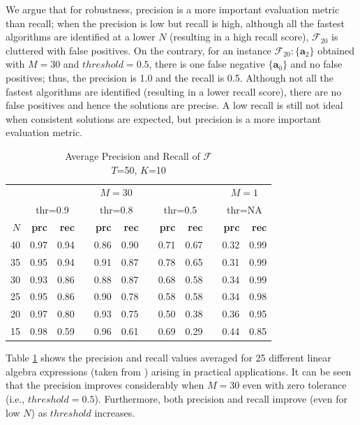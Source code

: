 \documentclass[conference]{IEEEtran}
\begin{document}
We argue that for robustness, precision is a more important evaluation metric than recall; when the precision is low but
recall is high, although all the fastest algorithms are identified at a lower $N$ (resulting in a high recall score),
$\mathcal{F}_{20}$ is cluttered with false positives. On the contrary, for an instance $\mathcal{F}_{20} : \{\mathbf{a}_2\}$ obtained with $M=30$ and
$threshold=0.5$, there is one false negative $\{\mathbf{a}_0\}$ and no false positives; thus, the precision is 1.0 and
the recall is 0.5. Although not all the fastest algorithms are identified (resulting in a lower recall score), there are
no false positives and hence the solutions are precise. A low recall is still not ideal when consistent solutions are expected, but precision is a more important evaluation metric. 
\begin{table}[h!]
	\begin{center}
		\renewcommand{\arraystretch}{1.2}
		\begin{tabular}{@{}r rr c rr c rr c rr@{}}
			\toprule
			& \multicolumn{8}{c}{$M=30$} & & \multicolumn{2}{c}{$M=1$} \\
			\cmidrule{2-9} \cmidrule{11-12}
			& \multicolumn{2}{c}{thr=0.9} & & \multicolumn{2}{c}{thr=0.8} & & \multicolumn{2}{c}{thr=0.5} & & \multicolumn{2}{c}{thr=NA} \\
			\cmidrule{2-3} \cmidrule{5-6} \cmidrule{8-9} \cmidrule{11-12}
			{$N$} & \textbf{prc} & \textbf{rec} && \textbf{prc} & \textbf{rec} && \textbf{prc} & \textbf{rec} && \textbf{prc} & \textbf{rec} \\
			\midrule
			{40} & 0.97  & 0.94  && 0.86  & 0.90  && 0.71  & 0.67 && 0.32 & 0.99 \\
			{35} & 0.95  & 0.94  && 0.91  & 0.87  && 0.78  & 0.65 && 0.31 & 0.99 \\
			{30} & 0.93  & 0.86  && 0.88  & 0.87  && 0.68  & 0.58 && 0.34 & 0.99 \\
			{25} & 0.95  & 0.86  && 0.90  & 0.78  && 0.58  & 0.58 && 0.34 & 0.98 \\
			{20} & 0.97  & 0.80  && 0.93  & 0.75  && 0.50  & 0.38 && 0.36 & 0.95 \\
			{15} & 0.98  & 0.59  && 0.96  & 0.61  && 0.69  & 0.29 && 0.44 & 0.85 \\
			\bottomrule
		\end{tabular}
		\caption{Average Precision and Recall of $\mathcal{F}$  \\ $T$=50, $K$=10}
		\label{tab:3}
	\end{center}
\end{table}
Table \ref{tab:3} shows the precision and recall values averaged for 25 different linear algebra expressions (taken from
\cite{barthels2019linnea}) arising in practical applications. It can be seen that the precision improves considerably when $M=30$ even with zero tolerance (i.e., $threshold = 0.5$). Furthermore, both precision and recall improve (even for low $N$) as $threshold$ increases.
 
\end{document}
